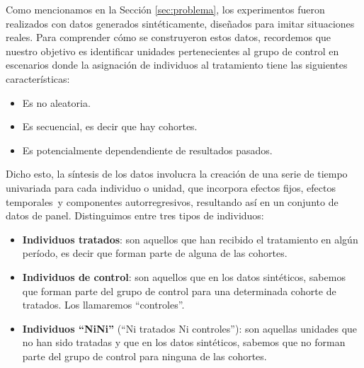 \documentclass[../../main.tex]{subfiles}
\begin{document}
Como mencionamos en la Sección \ref{sec:problema}, los experimentos fueron realizados con
datos generados sintéticamente, diseñados para imitar situaciones reales. Para comprender
cómo se construyeron estos datos, recordemos que nuestro objetivo es identificar
unidades pertenecientes al grupo de control en escenarios donde la asignación de
individuos al tratamiento tiene las siguientes características:
\begin{itemize}[itemsep=0.05cm]
    \item Es no aleatoria.
    \item Es secuencial, es decir que hay cohortes.
    \item Es potencialmente dependendiente de resultados pasados.
\end{itemize}

Dicho esto, la síntesis de los datos involucra la creación de una serie de tiempo
univariada para cada individuo o unidad, que incorpora efectos fijos\footnotemark, efectos
temporales\footnotemark\ y componentes autorregresivos\footnotemark, resultando así en un
conjunto de datos de panel. Distinguimos entre tres tipos de individuos:
\begin{itemize}[itemsep=0.1cm]
    \item \textbf{Individuos tratados}: son aquellos que han recibido el tratamiento en
    algún período, es decir que forman parte de alguna de las cohortes.
    \item \textbf{Individuos de control}: son aquellos que en los datos sintéticos,
    sabemos que forman parte del grupo de control para una determinada cohorte de
    tratados. Los llamaremos ``controles''.
    \item \textbf{Individuos ``NiNi''} (``Ni tratados Ni controles''): son aquellas
    unidades que no han sido tratadas y que en los datos sintéticos, sabemos que no forman
    parte del grupo de control para ninguna de las cohortes.
\end{itemize}
\end{document}
